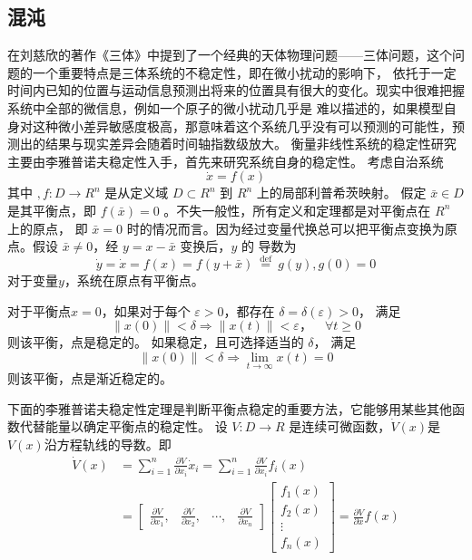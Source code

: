 \subsection{混沌}
在刘慈欣的著作《三体》中提到了一个经典的天体物理问题——三体问题，这个问题的一个重要特点是三体系统的不稳定性，即在微小扰动的影响下，
依托于一定时间内已知的位置与运动信息预测出将来的位置具有很大的变化。现实中很难把握系统中全部的微信息，例如一个原子的微小扰动几乎是
难以描述的，如果模型自身对这种微小差异敏感度极高，那意味着这个系统几乎没有可以预测的可能性，预测出的结果与现实差异会随着时间轴指数级放大。
衡量非线性系统的稳定性研究主要由李雅普诺夫稳定性入手，首先来研究系统自身的稳定性。
考虑自治系统
\begin{equation}
    \dot{x}=f(x)
\end{equation}
其中 $,f: D \rightarrow R^n$ 是从定义域 $D \subset R^n$ 到 $R^n$ 上的局部利普希茨映射。
假定 $\bar{x} \in D$ 是其平衡点，即 $f(\bar{x})=0$ 。不失一般性，所有定义和定理都是对平衡点在 $R^n$ 上的原点，
即 $\bar{x}=0$ 时的情况而言。因为经过变量代换总可以把平衡点变换为原点。假设 $\bar{x} \neq 0$，经 $y=x-\bar{x}$ 变换后，$y$ 的
导数为
\begin{equation}
    \dot{y}=\dot{x}=f(x)=f(y+\bar{x}) \stackrel{\text { def }}{=} g(y),g(0)=0
\end{equation}
对于变量$y$，系统在原点有平衡点。
\begin{definition}
    对于平衡点$x=0$，如果对于每个 $\varepsilon>0$，都存在 $\delta=\delta(\varepsilon)>0$， 满足
    \begin{equation}
        \|x(0)\|<\delta \Rightarrow\|x(t)\|<\varepsilon，\quad \forall t \geqslant 0
    \end{equation}
    则该平衡，点是稳定的。
    如果稳定，且可选择适当的 $\delta$， 满足
    \begin{equation}
        \|x(0)\|<\delta \Rightarrow \lim _{t \rightarrow \infty} x(t)=0
    \end{equation}
    则该平衡，点是渐近稳定的。
\end{definition}
下面的李雅普诺夫稳定性定理是判断平衡点稳定的重要方法，它能够用某些其他函数代替能量以确定平衡点的稳定性。
设 $V: D \rightarrow R$ 是连续可微函数，$\dot{V}(x)$是$V(x)$沿方程轨线的导数。即
\begin{equation}
    \begin{aligned}
    \dot{V}(x) & =\sum_{i=1}^n \frac{\partial V}{\partial x_i} \dot{x}_i=\sum_{i=1}^n \frac{\partial V}{\partial x_i} f_i(x) \\
    & =\left[\begin{array}{llll}
    \frac{\partial V}{\partial x_1},& \frac{\partial V}{\partial x_2},& \cdots,& \frac{\partial V}{\partial x_n}
    \end{array}\right]\left[\begin{array}{c}
    f_1(x) \\
    f_2(x) \\
    \vdots \\
    f_n(x)
    \end{array}\right]=\frac{\partial V}{\partial x} f(x)
    \end{aligned}
\end{equation}
